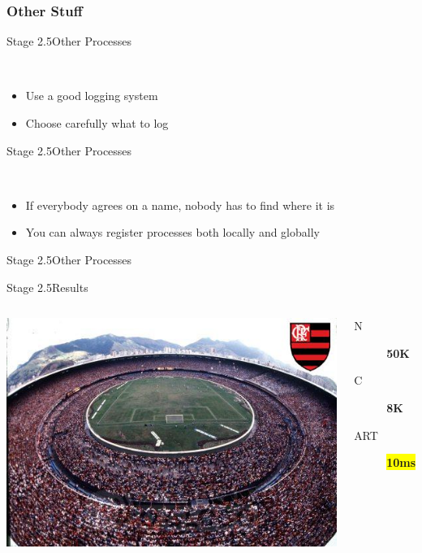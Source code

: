 \documentclass[utf8]{beamer}
\begin{document}
\subsubsection{Other Stuff}
\begin{frame}{Stage 2.5}{Other Processes}
	\begin{description}
		\item<+->[Logging]\ \\
			\begin{itemize}
				\item Use a good logging system
				\item Choose carefully what to log
			\end{itemize}
	\end{description}
\end{frame}
\begin{frame}{Stage 2.5}{Other Processes}
	\begin{description}
		\item<+->[Registration]\ \\
			\begin{itemize}
				\item If everybody agrees on a name, nobody has to find where it is
				\item You can always register processes \alert{both} locally and globally
			\end{itemize}
	\end{description}
\end{frame}
\begin{frame}{Stage 2.5}{Other Processes}
\dispatcher
\end{frame}
\begin{frame}{Stage 2.5}{Results}
	\begin{columns}
			\includegraphics[top=-1,width=\textwidth]{img/results-3-5.jpg}
			\begin{description}
				\item[N] \textbf{\Large 50K}
				\item[C] \textbf{\Large 8K}
				\item[ART] \textbf{\colorbox{yellow}{\Large 10ms}}
			\end{description}
	\end{columns}
\end{frame}
\end{document}

